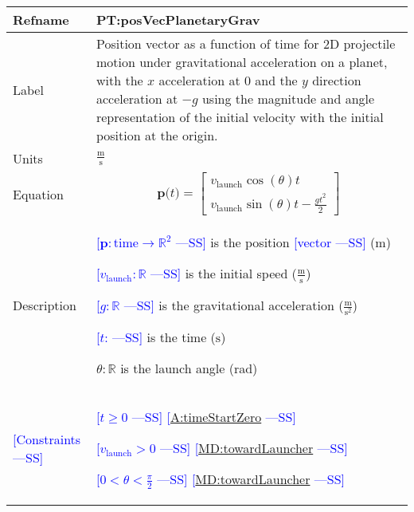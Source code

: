 \documentclass[12pt]{article}
\newcommand{\authornote}[3]{\textcolor{#1}{[#3 ---#2]}}
\newcommand{\authornote}[3]{}
\newcommand{\wss}[1]{\authornote{blue}{SS}{#1}}
\begin{document}
\noindent \begin{minipage}{\textwidth}
\begin{tabular}{>{\raggedright}p{}>{\raggedright\arraybackslash}p{}}
\toprule \textbf{Refname} & \textbf{PT:posVecPlanetaryGrav} 
\label{PT:posVecPlanetaryGrav} \\ \midrule Label & Position vector as a function
of time for 2D projectile motion under gravitational acceleration on a planet,
with the $x$ acceleration at 0 and the $y$ direction acceleration at $-g$ using
the magnitude and angle representation of the initial velocity with the initial
position at the origin.
        
\\ \midrule
Units & $\frac{\text{m}}{\text{s}}$
        
\\ \midrule
Equation & \begin{displaymath}
           \symbf{p}\text{(}t\text{)}=\begin{bmatrix}
                                      {v}_{\text{launch}} \cos(\theta) t \\
                                      {v}_{\text{launch}} \sin(\theta) t - \frac{g t^2}{2}
                                      \end{bmatrix}
           \end{displaymath}
\\ \midrule
Description & \begin{symbDescription}
              \item{\wss{$\symbf{p}: \text{time} \rightarrow \mathbb{R}^2$} is the position \wss{vector} (${\text{m}}$)}
              \item{\wss{${{v}_{\text{launch}}}: \mathbb{R}$} is the initial speed ($\frac{\text{m}}{\text{s}}$)}
              \item{\wss{$g: \mathbb{R}$} is the gravitational acceleration ($\frac{\text{m}}{\text{s}^{2}}$)}
              \item{\wss{$t$: \text{time}} is the time (${\text{s}}$)}
              \item $\theta: \mathbb{R}$ is the launch angle (rad)
              \end{symbDescription}

\\ \midrule
\wss{Constraints} & 
\begin{symbDescription}
\item \wss{$t \geq 0$} \wss{\hyperref[timeStartZero]{A:timeStartZero}}
\item \wss{$v_\text{launch} > 0$} \wss{\hyperref[MD:towardLauncher]{MD:towardLauncher}}
\item \wss{$
0 < \theta < \frac{\pi}{2}$} \wss{\hyperref[MD:towardLauncher]{MD:towardLauncher}}
\end{symbDescription}


\end{tabular}
\end{minipage}
\end{document}
